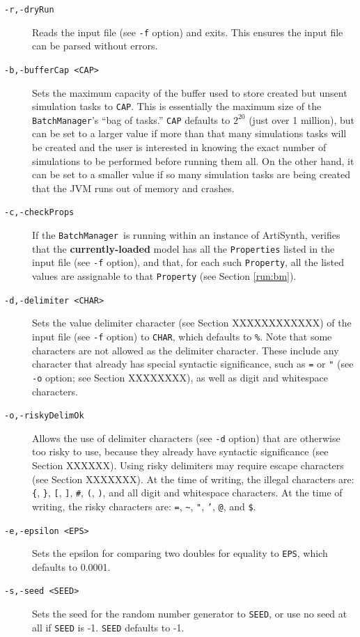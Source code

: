 \documentclass{article}
\newcommand{\BM}{{\tt BatchManager}}
\begin{document}
\begin{description}
\item[{\tt -r,-dryRun} ] \mbox{}

Reads the input file (see {\tt -f} option) and exits. This ensures the input file can be parsed without errors.

\item[{\tt -b,-bufferCap <CAP>} ] \mbox{}

Sets the maximum capacity of the buffer used to store created but unsent simulation tasks to {\tt CAP}. This is essentially the maximum size of the \BM's ``bag of tasks.'' {\tt CAP} defaults to $2^{20}$ (just over 1 million), but can be set to a larger value if more than that many simulations tasks will be created and the user is interested in knowing the exact number of simulations to be performed before running them all. On the other hand, it can be set to a smaller value if so many simulation tasks are being created that the JVM runs out of memory and crashes.

\item[{\tt -c,-checkProps} ] \mbox{}

If the \BM\ is running within an instance of ArtiSynth, verifies that the \textbf{currently-loaded} model has all the {\tt Properties} listed in the input file (see {\tt -f} option), and that, for each such {\tt Property}, all the listed values are assignable to that {\tt Property} (see Section \ref{run:bm}).

\item[{\tt -d,-delimiter <CHAR>} ] \mbox{}

Sets the value delimiter character (see Section XXXXXXXXXXXX) of the input file (see {\tt -f} option) to {\tt CHAR}, which defaults to {\tt \%}. Note that some characters are not allowed as the delimiter character. These include any character that already has special syntactic significance, such as {\tt =} or {\tt "} (see {\tt -o} option; see Section XXXXXXXX), as well as digit and whitespace characters.

\item[{\tt -o,-riskyDelimOk} ] \mbox{}

Allows the use of delimiter characters (see {\tt -d} option) that are otherwise too risky to use, because they already have syntactic significance (see Section XXXXXX). Using risky delimiters may require escape characters (see Section XXXXXXX). At the time of writing, the illegal characters are: {\tt \{}, {\tt \}}, {\tt [}, {\tt ]}, {\tt \#}, {\tt (}, {\tt )}, and all digit and whitespace characters. At the time of writing, the risky characters are: {\tt =}, {\tt \textasciitilde}, {\tt "}, {\tt '}, {\tt @}, and {\tt \$}.

\item[{\tt -e,-epsilon <EPS>} ] \mbox{}

Sets the epsilon for comparing two doubles for equality to {\tt EPS}, which defaults to 0.0001.

\item[{\tt -s,-seed <SEED>} ] \mbox{}

Sets the seed for the random number generator to {\tt SEED}, or use no seed at all if {\tt SEED} is -1. {\tt SEED} defaults to -1.

\end{description}
\end{document}
